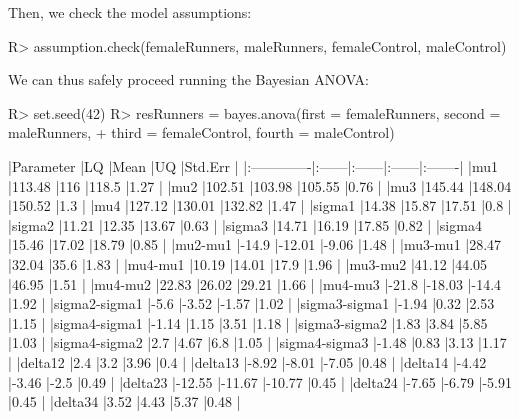 Then, we check the model assumptions:
\begin{example}
R> assumption.check(femaleRunners, maleRunners, femaleControl, maleControl)
\end{example}
We can thus safely proceed running the Bayesian ANOVA:
\begin{example}
R> set.seed(42)
R> resRunners = bayes.anova(first = femaleRunners, second = maleRunners, 
+  third = femaleControl, fourth = maleControl)

|Parameter     |LQ     |Mean   |UQ     |Std.Err |
|:-------------|:------|:------|:------|:-------|
|mu1           |113.48 |116    |118.5  |1.27    |
|mu2           |102.51 |103.98 |105.55 |0.76    |
|mu3           |145.44 |148.04 |150.52 |1.3     |
|mu4           |127.12 |130.01 |132.82 |1.47    |
|sigma1        |14.38  |15.87  |17.51  |0.8     |
|sigma2        |11.21  |12.35  |13.67  |0.63    |
|sigma3        |14.71  |16.19  |17.85  |0.82    |
|sigma4        |15.46  |17.02  |18.79  |0.85    |
|mu2-mu1       |-14.9  |-12.01 |-9.06  |1.48    |
|mu3-mu1       |28.47  |32.04  |35.6   |1.83    |
|mu4-mu1       |10.19  |14.01  |17.9   |1.96    |
|mu3-mu2       |41.12  |44.05  |46.95  |1.51    |
|mu4-mu2       |22.83  |26.02  |29.21  |1.66    |
|mu4-mu3       |-21.8  |-18.03 |-14.4  |1.92    |
|sigma2-sigma1 |-5.6   |-3.52  |-1.57  |1.02    |
|sigma3-sigma1 |-1.94  |0.32   |2.53   |1.15    |
|sigma4-sigma1 |-1.14  |1.15   |3.51   |1.18    |
|sigma3-sigma2 |1.83   |3.84   |5.85   |1.03    |
|sigma4-sigma2 |2.7    |4.67   |6.8    |1.05    |
|sigma4-sigma3 |-1.48  |0.83   |3.13   |1.17    |
|delta12       |2.4    |3.2    |3.96   |0.4     |
|delta13       |-8.92  |-8.01  |-7.05  |0.48    |
|delta14       |-4.42  |-3.46  |-2.5   |0.49    |
|delta23       |-12.55 |-11.67 |-10.77 |0.45    |
|delta24       |-7.65  |-6.79  |-5.91  |0.45    |
|delta34       |3.52   |4.43   |5.37   |0.48    |
\end{example}


